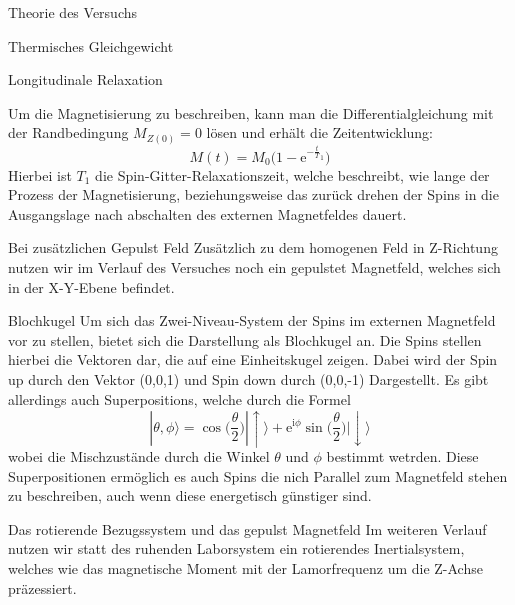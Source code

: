\documentclass[pdftex, a4paper,11pt, twoside, ngerman]{report}
\begin{document}
\begin{chapter}{Theorie des Versuchs}
\begin{section}{Thermisches Gleichgewicht}
    \end{section}

    \begin{section}{Longitudinale Relaxation}

        Um die Magnetisierung zu beschreiben, kann man die Differentialgleichung \todo
        mit der Randbedingung $M_{Z(0)} =0$ lösen und erhält die Zeitentwicklung:
        \[
            M(t) = M_0\big (1-\mathrm e^{-\frac tT_1}\big)
        \]
        Hierbei ist $T_1$ die Spin-Gitter-Relaxationszeit, welche beschreibt, wie lange der Prozess der Magnetisierung, beziehungsweise das zurück drehen der Spins in die Ausgangslage nach abschalten des externen Magnetfeldes dauert.

    \end{section}

    \begin{section}{Bei zusätzlichen Gepulst Feld}
        Zusätzlich zu dem homogenen Feld in Z-Richtung nutzen wir im Verlauf des Versuches noch ein gepulstet Magnetfeld, welches sich in der X-Y-Ebene befindet.

        \begin{subsection}{Blochkugel}
            Um sich das Zwei-Niveau-System der Spins im externen Magnetfeld vor zu stellen, bietet sich die Darstellung als Blochkugel an.
            Die Spins stellen hierbei die Vektoren dar, die auf eine Einheitskugel zeigen.
            Dabei wird der Spin up durch den Vektor (0,0,1) und Spin down durch (0,0,-1) Dargestellt.
            Es gibt allerdings auch Superpositions, welche durch die Formel 
            \[
                |\theta,\phi\rangle = \cos\big (\frac \theta 2 \big ) |\uparrow\rangle + \mathrm e^{\mathrm i\phi}\sin\big (\frac \theta 2\big )|\downarrow\rangle
            \]
            wobei die Mischzustände durch die Winkel $\theta$ und $\phi$ bestimmt wetrden.
            Diese Superpositionen ermöglich es auch Spins die nich Parallel zum Magnetfeld stehen zu beschreiben, auch wenn diese energetisch günstiger sind.

        \end{subsection}

        \begin{subsection}{Das rotierende Bezugssystem und das gepulst Magnetfeld}
            Im weiteren Verlauf nutzen wir statt des ruhenden Laborsystem ein rotierendes Inertialsystem, welches wie das magnetische Moment mit der Lamorfrequenz um die Z-Achse präzessiert.


\end{subsection}
\end{section}
\end{chapter}
\end{document}
